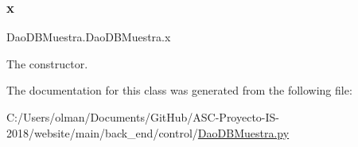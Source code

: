 \subsubsection{\texorpdfstring{x}{x}}
{\footnotesize\ttfamily Dao\+D\+B\+Muestra.\+Dao\+D\+B\+Muestra.\+x}



The constructor. 



The documentation for this class was generated from the following file\+:\begin{DoxyCompactItemize}
\item 
C\+:/\+Users/olman/\+Documents/\+Git\+Hub/\+A\+S\+C-\/\+Proyecto-\/\+I\+S-\/2018/website/main/back\+\_\+end/control/\mbox{\hyperlink{_dao_d_b_muestra_8py}{Dao\+D\+B\+Muestra.\+py}}\end{DoxyCompactItemize}
